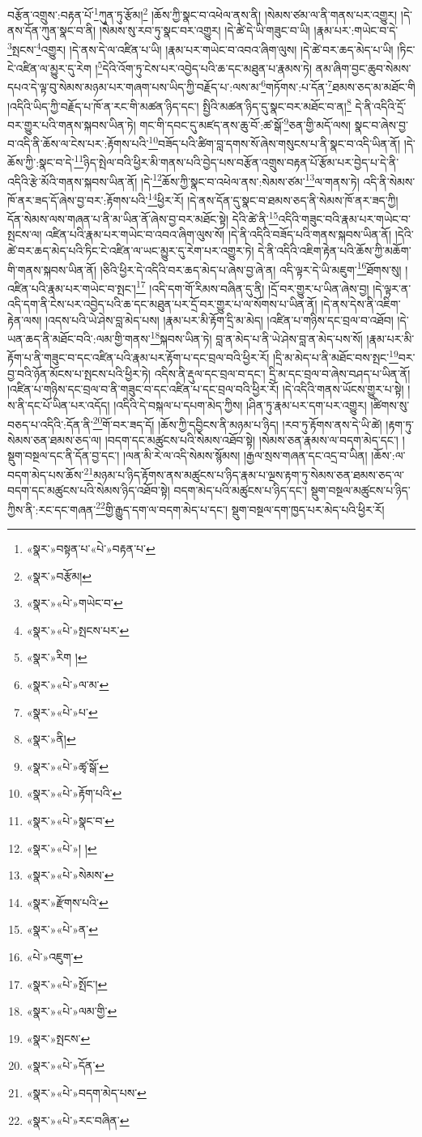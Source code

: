 བརྩོན་འགྲུས་:བརྟན་པོ་\footnote{«སྣར་»བསྟན་པ་«པེ་»བརྟན་པ་}ཀུན་ཏུ་རྩོམ།\footnote{«སྣར་»བརྩོམ།} །ཆོས་ཀྱི་སྣང་བ་འཕེལ་ནས་ནི། །སེམས་ཙམ་ལ་ནི་གནས་པར་འགྱུར། །དེ་ནས་དོན་ཀུན་སྣང་བ་ནི། །སེམས་སུ་རབ་ཏུ་སྣང་བར་འགྱུར། །དེ་ཚེ་དེ་ཡི་གཟུང་བ་ཡི། །རྣམ་པར་:གཡེང་བ་དེ་\footnote{«སྣར་»«པེ་»གཡེང་བ་}སྤངས་\footnote{«སྣར་»«པེ་»སྤངས་པར་}འགྱུར། །དེ་ནས་དེ་ལ་འཛིན་པ་ཡི། །རྣམ་པར་གཡེང་བ་འབའ་ཞིག་ལུས། །དེ་ཚེ་བར་ཆད་མེད་པ་ཡི། །ཏིང་ངེ་འཛིན་ལ་མྱུར་དུ་རེག །\footnote{«སྣར་»རིག །}དེའི་འོག་ཏུ་ངེས་པར་འབྱེད་པའི་ཆ་དང་མཐུན་པ་རྣམས་ཏེ། ནམ་ཞིག་བྱང་ཆུབ་སེམས་དཔའ་དེ་ལྟ་བུ་སེམས་མཉམ་པར་གཞག་པས་ཡིད་ཀྱི་བརྗོད་པ་:ལས་མ་\footnote{«སྣར་»«པེ་»ལ་མ་}གཏོགས་:པ་དོན་\footnote{«སྣར་»«པེ་»པ་}ཐམས་ཅད་མ་མཐོང་གི །འདིའི་ཡིད་ཀྱི་བརྗོད་པ་ཁོ་ན་རང་གི་མཚན་ཉིད་དང་། སྤྱིའི་མཚན་ཉིད་དུ་སྣང་བར་མཐོང་བ་ན།\footnote{«སྣར་»ནི།} དེ་ནི་འདིའི་དྲོ་བར་གྱུར་པའི་གནས་སྐབས་ཡིན་ཏེ། གང་གི་དབང་དུ་མཛད་ནས་ཆུ་བོ་:ཚ་སྒོ་\footnote{«སྣར་»«པེ་»ཚྭ་སྒོ་}ཅན་གྱི་མདོ་ལས། སྣང་བ་ཞེས་བྱ་བ་འདི་ནི་ཆོས་ལ་ངེས་པར་:རྟོགས་པའི་\footnote{«སྣར་»«པེ་»རྟོག་པའི་}བཟོད་པའི་ཚིག་བླ་དགས་སོ་ཞེས་གསུངས་པ་ནི་སྣང་བ་འདི་ཡིན་ནོ། །དེ་ཆོས་ཀྱི་:སྣང་བ་དེ་\footnote{«སྣར་»«པེ་»སྣང་བ་}ཉིད་སྤེལ་བའི་ཕྱིར་མི་གནས་པའི་བྱེད་པས་བརྩོན་འགྲུས་བརྟན་པོ་རྩོམ་པར་བྱེད་པ་དེ་ནི་འདིའི་རྩེ་མོའི་གནས་སྐབས་ཡིན་ནོ། །དེ་\footnote{«སྣར་»«པེ་»། །}ཆོས་ཀྱི་སྣང་བ་འཕེལ་ནས་:སེམས་ཙམ་\footnote{«སྣར་»«པེ་»སེམས་}ལ་གནས་ཏེ། འདི་ནི་སེམས་ཁོ་ནར་ཟད་དོ་ཞེས་བྱ་བར་:རྟོགས་པའི་\footnote{«སྣར་»རྫོགས་པའི་}ཕྱིར་རོ། །དེ་ནས་དོན་དུ་སྣང་བ་ཐམས་ཅད་ནི་སེམས་ཁོ་ནར་ཟད་ཀྱི། དོན་སེམས་ལས་གཞན་པ་ནི་མ་ཡིན་ནོ་ཞེས་བྱ་བར་མཐོང་སྟེ། དེའི་ཚེ་ནི་\footnote{«སྣར་»«པེ་»ན་}འདིའི་གཟུང་བའི་རྣམ་པར་གཡེང་བ་སྤངས་ལ། འཛིན་པའི་རྣམ་པར་གཡེང་བ་འབའ་ཞིག་ལུས་སོ། །དེ་ནི་འདིའི་བཟོད་པའི་གནས་སྐབས་ཡིན་ནོ། །དེའི་ཚེ་བར་ཆད་མེད་པའི་ཏིང་ངེ་འཛིན་ལ་ཡང་མྱུར་དུ་རེག་པར་འགྱུར་ཏེ། དེ་ནི་འདིའི་འཇིག་རྟེན་པའི་ཆོས་ཀྱི་མཆོག་གི་གནས་སྐབས་ཡིན་ནོ། །ཅིའི་ཕྱིར་དེ་འདིའི་བར་ཆད་མེད་པ་ཞེས་བྱ་ཞེ་ན། འདི་ལྟར་དེ་ཡི་མཇུག་\footnote{«པེ་»འཇུག་}ཐོགས་སུ། །འཛིན་པའི་རྣམ་པར་གཡེང་བ་སྤང་།\footnote{«སྣར་»«པེ་»སྤོང་།} །འདི་དག་གོ་རིམས་བཞིན་དུ་ནི། །དྲོ་བར་གྱུར་པ་ཡིན་ཞེས་བྱ། །དེ་ལྟར་ན་འདི་དག་ནི་ངེས་པར་འབྱེད་པའི་ཆ་དང་མཐུན་པར་དྲོ་བར་གྱུར་པ་ལ་སོགས་པ་ཡིན་ནོ། །དེ་ནས་དེས་ནི་འཇིག་རྟེན་ལས། །འདས་པའི་ཡེ་ཤེས་བླ་མེད་པས། །རྣམ་པར་མི་རྟོག་དྲི་མ་མེད། །འཛིན་པ་གཉིས་དང་བྲལ་བ་འཐོབ། །དེ་ཡན་ཆད་ནི་མཐོང་བའི་:ལམ་གྱི་གནས་\footnote{«སྣར་»«པེ་»ལམ་གྱི་}སྐབས་ཡིན་ཏེ། བླ་ན་མེད་པ་ནི་ཡེ་ཤེས་བླ་ན་མེད་པས་སོ། །རྣམ་པར་མི་རྟོག་པ་ནི་གཟུང་བ་དང་འཛིན་པའི་རྣམ་པར་རྟོག་པ་དང་བྲལ་བའི་ཕྱིར་རོ། །དྲི་མ་མེད་པ་ནི་མཐོང་བས་སྤང་\footnote{«སྣར་»སྤངས་}བར་བྱ་བའི་ཉོན་མོངས་པ་སྤངས་པའི་ཕྱིར་ཏེ། འདིས་ནི་རྡུལ་དང་བྲལ་བ་དང་། དྲི་མ་དང་བྲལ་བ་ཞེས་བཤད་པ་ཡིན་ནོ། །འཛིན་པ་གཉིས་དང་བྲལ་བ་ནི་གཟུང་བ་དང་འཛིན་པ་དང་བྲལ་བའི་ཕྱིར་རོ། །དེ་འདིའི་གནས་ཡོངས་གྱུར་པ་སྟེ། །ས་ནི་དང་པོ་ཡིན་པར་འདོད། །འདིའི་དེ་བསྐལ་པ་དཔག་མེད་ཀྱིས། །ཤིན་ཏུ་རྣམ་པར་དག་པར་འགྱུར། །ཚིགས་སུ་བཅད་པ་འདིའི་:དོན་ནི་\footnote{«སྣར་»«པེ་»དོན་}གོ་བར་ཟད་དོ། །ཆོས་ཀྱི་དབྱིངས་ནི་མཉམ་པ་ཉིད། །རབ་ཏུ་རྟོགས་ནས་དེ་ཡི་ཚེ། །རྟག་ཏུ་སེམས་ཅན་ཐམས་ཅད་ལ། །བདག་དང་མཚུངས་པའི་སེམས་འཐོབ་སྟེ། །སེམས་ཅན་རྣམས་ལ་བདག་མེད་དང་། །སྡུག་བསྔལ་དང་ནི་དོན་བྱ་དང་། །ལན་མི་རེ་ལ་འདི་སེམས་སྙོམས། །རྒྱལ་སྲས་གཞན་དང་འདྲ་བ་ཡིན། །ཆོས་:ལ་བདག་མེད་པས་ཆོས་\footnote{«སྣར་»«པེ་»བདག་མེད་པས་}མཉམ་པ་ཉིད་རྟོགས་ནས་མཚུངས་པ་ཉིད་རྣམ་པ་ལྔས་རྟག་ཏུ་སེམས་ཅན་ཐམས་ཅད་ལ་བདག་དང་མཚུངས་པའི་སེམས་ཉིད་འཐོབ་སྟེ། བདག་མེད་པའི་མཚུངས་པ་ཉིད་དང་། སྡུག་བསྔལ་མཚུངས་པ་ཉིད་ཀྱིས་ནི་:རང་དང་གཞན་\footnote{«སྣར་»«པེ་»རང་བཞིན་}གྱི་རྒྱུད་དག་ལ་བདག་མེད་པ་དང་། སྡུག་བསྔལ་དག་ཁྱད་པར་མེད་པའི་ཕྱིར་རོ། 
